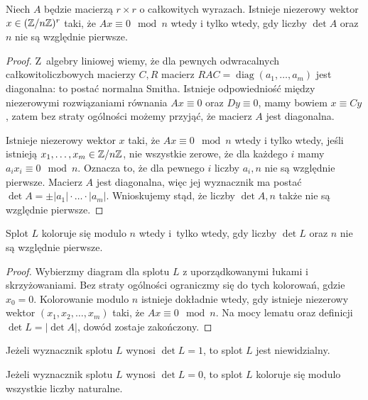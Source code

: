\begin{lemma}
    Niech $A$ będzie macierzą $r \times r$ o całkowitych wyrazach.
    Istnieje niezerowy wektor $x \in (\mathbb Z/n\mathbb Z)^r$ taki, że $Ax \equiv 0 \mod n$ wtedy i tylko wtedy, gdy liczby $\det A$ oraz $n$ nie są względnie pierwsze.
\end{lemma}

\begin{proof}
    Z~algebry liniowej wiemy, że dla pewnych odwracalnych całkowitoliczbowych macierzy $C, R$ macierz $RAC = \operatorname{diag}(a_1, \ldots, a_m)$ jest diagonalna: to postać normalna Smitha.
    Istnieje odpowiedniość między niezerowymi rozwiązaniami równania $Ax \equiv 0$ oraz $Dy \equiv 0$, mamy bowiem $x \equiv Cy$, zatem bez straty ogólności możemy przyjąć, że macierz $A$ jest diagonalna.

    Istnieje niezerowy wektor $x$ taki, że $Ax \equiv 0 \mod n$ wtedy i tylko wtedy, jeśli istnieją $x_1, \ldots, x_m \in \mathbb Z/n\mathbb Z$, nie wszystkie zerowe, że dla każdego $i$ mamy $a_ix_i \equiv 0 \mod n$.
    Oznacza to, że dla pewnego $i$ liczby $a_i, n$ nie są względnie pierwsze.
    Macierz $A$ jest diagonalna, więc jej wyznacznik ma postać $\det A = \pm |a_1| \cdot \ldots \cdot |a_m|$.
    Wnioskujemy stąd, że liczby $\det A, n$ także nie są względnie pierwsze.
\end{proof}

\begin{proposition}
\label{prp:colour_determinant}%
    Splot $L$ koloruje się modulo $n$ wtedy i~tylko wtedy, gdy liczby $\det L$ oraz $n$ nie są względnie pierwsze.
\end{proposition}

\begin{proof}
    Wybierzmy diagram dla splotu $L$ z uporządkowanymi łukami i skrzyżowaniami.
    Bez straty ogólności ograniczmy się do tych kolorowań, gdzie $x_0 = 0$.
    Kolorowanie modulo $n$ istnieje dokładnie wtedy, gdy istnieje niezerowy wektor $(x_1, x_2, \ldots, x_m)$ taki, że $Ax \equiv 0 \mod n$.
    Na mocy lematu oraz definicji $\det L = |\det A|$, dowód zostaje zakończony.
\end{proof}

\begin{corollary}
%
    Jeżeli wyznacznik splotu $L$ wynosi $\det L = 1$, to splot $L$ jest niewidzialny.
\end{corollary}

\begin{corollary}
    Jeżeli wyznacznik splotu $L$ wynosi $\det L = 0$, to splot $L$ koloruje się modulo wszystkie liczby naturalne.
\end{corollary}

